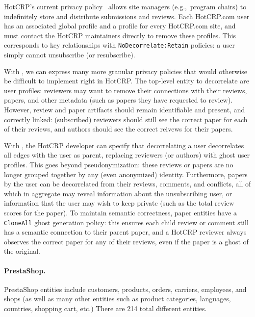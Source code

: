 HotCRP's current privacy policy~\cite{hotcrp_privacy} allows site managers (e.g.,\ program chairs)
to indefinitely store and distribute submissions and reviews. Each HotCRP.com user has an associated
global profile and a profile for every HotCRP.com site, and must contact the HotCRP maintainers
directly to remove these profiles. This corresponds to key relationships with
\texttt{NoDecorrelate:Retain} policies: a user simply cannot unsubscribe (or resubscribe).

With \sys{}, we can express many more granular privacy policies that would otherwise be difficult to
implement right in HotCRP. The top-level entity to decorrelate are user profiles: reviewers may want
to remove their connections with their reviews, papers, and other metadata (such as papers they
have requested to review).
However, review and paper artifacts should remain identifiable and present, and correctly linked:
(subscribed) reviewers should still see the correct paper for each of their reviews, and authors
should see the correct reivews for their papers.

With \sys{}, the HotCRP developer can specify that decorrelating a user decorrelates all edges with
the user as parent, replacing reviewers (or authors) with ghost user profiles. This goes beyond
pseudonymization: these reviews or papers are no longer grouped together by any (even anonymized)
identity. Furthermore, papers by the user can be decorrelated from their reviews, comments, and
conflicts, all of which in aggregate may reveal information about the unsubscribing user, or information that the
user may wish to keep private (such as the total review scores for the paper). To maintain semantic
correctness, paper entities have a \texttt{CloneAll} ghost generation policy: this ensures each child
review or comment still has a semantic connection to their parent paper, and a HotCRP reviewer
always observes the correct paper for any of their reviews, even if the paper is a ghost of the
original.

\paragraph{PrestaShop.} 
PrestaShop entities include customers, products, orders, carriers, employees, and shops (as well as
many other entities such as product categories, languages, countries, shopping cart, etc.) There are
214 total different entities. 

